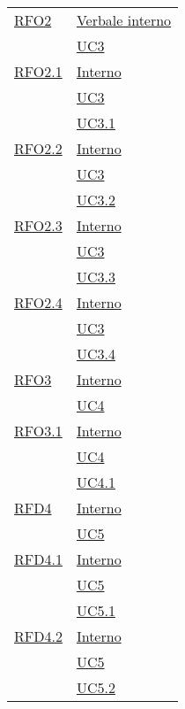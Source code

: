 \begin{longtable}{|>{\centering}m{5cm}|m{5cm}<{\centering}|}
\hyperlink{RFO2}{RFO2} & \hyperlink{Verbale interno}{Verbale interno}\\
& \hyperref[UC3]{UC3}\\ \hline

\hyperlink{RFO2.1}{RFO2.1} & \hyperlink{Interno}{Interno}\\
& \hyperref[UC3]{UC3}\\
& \hyperref[UC3.1]{UC3.1}\\ \hline

\hyperlink{RFO2.2}{RFO2.2} & \hyperlink{Interno}{Interno}\\
& \hyperref[UC3]{UC3}\\
& \hyperref[UC3.2]{UC3.2}\\ \hline

\hyperlink{RFO2.3}{RFO2.3} & \hyperlink{Interno}{Interno}\\
& \hyperref[UC3]{UC3}\\
& \hyperref[UC3.3]{UC3.3}\\ \hline

\hyperlink{RFO2.4}{RFO2.4} & \hyperlink{Interno}{Interno}\\
& \hyperref[UC3]{UC3}\\
& \hyperref[UC3.4]{UC3.4}\\ \hline

\hyperlink{RFO3}{RFO3} & \hyperlink{Interno}{Interno}\\
& \hyperref[UC4]{UC4}\\ \hline

\hyperlink{RFO3.1}{RFO3.1} & \hyperlink{Interno}{Interno}\\
& \hyperref[UC4]{UC4}\\
& \hyperref[UC4.1]{UC4.1}\\ \hline

\hyperlink{RFD4}{RFD4} & \hyperlink{Interno}{Interno}\\
& \hyperref[UC5]{UC5}\\ \hline

\hyperlink{RFD4.1}{RFD4.1} & \hyperlink{Interno}{Interno}\\
& \hyperref[UC5]{UC5}\\
& \hyperref[UC5.1]{UC5.1}\\ \hline

\hyperlink{RFD4.2}{RFD4.2} & \hyperlink{Interno}{Interno}\\
& \hyperref[UC5]{UC5}\\
& \hyperref[UC5.2]{UC5.2}\\ \hline


\end{longtable}
